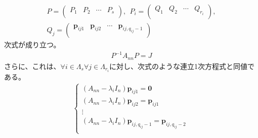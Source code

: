 \documentclass[dvipdfmx]{jsarticle}
\begin{document}
\begin{thm}
\begin{align*}
P = \begin{pmatrix}
P_{1} & P_{2} & \cdots & P_{s} \\
\end{pmatrix},\ \ P_{i} = \begin{pmatrix}
Q_{1} & Q_{2} & \cdots & Q_{r_{i}} \\
\end{pmatrix},\\
Q_{j} = \begin{pmatrix}
\mathbf{p}_{ij1} & \mathbf{p}_{ij2} & \cdots & \mathbf{p}_{ij,q_{ij} - 1} \\
\end{pmatrix}
\end{align*}
次式が成り立つ。
\begin{align*}
P^{- 1}A_{nn}P = J
\end{align*}
さらに、これは、$\forall i \in \varLambda_{s}\forall j \in \varLambda_{r_{i}}$に対し、次式のような連立1次方程式と同値である。
\begin{align*}
\left\{ \begin{matrix}
\left( A_{nn} - \lambda_{i}I_{n} \right)\mathbf{p}_{ij1} = \mathbf{0} \\
\left( A_{nn} - \lambda_{i}I_{n} \right)\mathbf{p}_{ij2} = \mathbf{p}_{ij1} \\
 \vdots \\
\left( A_{nn} - \lambda_{i}I_{n} \right)\mathbf{p}_{ij,q_{ij} - 1} = \mathbf{p}_{ij,q_{ij} - 2} \\
\end{matrix} \right.\ 
\end{align*}
\end{thm}
\end{document}
